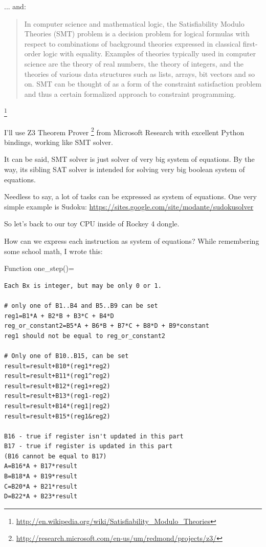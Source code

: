 ... and:

\begin{framed}
\begin{quotation}
In computer science and mathematical logic, the Satisfiability Modulo Theories (SMT) problem is a decision problem for logical formulas with respect to combinations of background theories expressed in classical first-order logic with equality. Examples of theories typically used in computer science are the theory of real numbers, the theory of integers, and the theories of various data structures such as lists, arrays, bit vectors and so on. SMT can be thought of as a form of the constraint satisfaction problem and thus a certain formalized approach to constraint programming.
\end{quotation}
\end{framed}\footnote{\url{http://en.wikipedia.org/wiki/Satisfiability_Modulo_Theories}}

I'll use Z3 Theorem Prover
\footnote{\url{http://research.microsoft.com/en-us/um/redmond/projects/z3/}} from Microsoft Research with excellent 
Python bindings, working like SMT solver.

It can be said, SMT solver is just solver of very big system of equations. 
By the way, its sibling SAT solver is intended for solving very big boolean system of equations.

Needless to say, a lot of tasks can be expressed as system of equations. 
One very simple example is Sudoku: \url{https://sites.google.com/site/modante/sudokusolver}

So let's back to our toy CPU inside of Rockey 4 dongle.

How can we express each instruction as system of equations? While remembering some school math, I wrote this:

Function one\_step()=

\begin{lstlisting}
Each Bx is integer, but may be only 0 or 1.

# only one of B1..B4 and B5..B9 can be set
reg1=B1*A + B2*B + B3*C + B4*D
reg_or_constant2=B5*A + B6*B + B7*C + B8*D + B9*constant
reg1 should not be equal to reg_or_constant2

# Only one of B10..B15, can be set
result=result+B10*(reg1*reg2)
result=result+B11*(reg1^reg2)
result=result+B12*(reg1+reg2)
result=result+B13*(reg1-reg2)
result=result+B14*(reg1|reg2)
result=result+B15*(reg1&reg2)

B16 - true if register isn't updated in this part
B17 - true if register is updated in this part
(B16 cannot be equal to B17)
A=B16*A + B17*result
B=B18*A + B19*result
C=B20*A + B21*result
D=B22*A + B23*result
\end{lstlisting}

